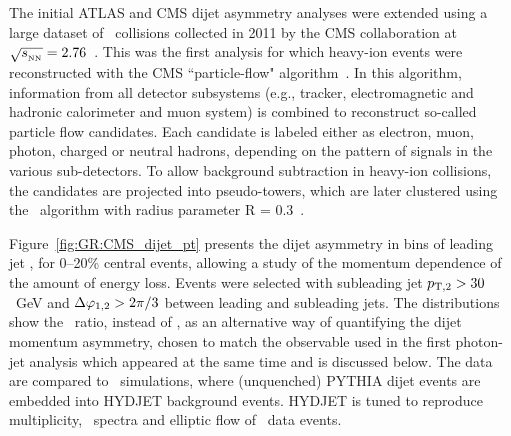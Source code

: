 The initial ATLAS and CMS dijet asymmetry analyses were extended using a
large dataset of \PbPb\ collisions
collected in 2011 by the CMS collaboration at $\sqrt{s_{_{\rm NN}}}=2.76$\TeV~\cite{CMS_dijet}.
This was the first analysis for which heavy-ion events were reconstructed
with the  CMS ``particle-flow"
algorithm~\cite{CMS-PAS-PFT-10-002,MattPFlow}. In this algorithm,
information from all detector subsystems (e.g., tracker, electromagnetic and hadronic
calorimeter and muon system) is combined to reconstruct so-called particle flow candidates.
Each candidate is labeled either as electron, muon, photon, charged or neutral hadrons,
depending on the pattern of signals in the various sub-detectors.
To allow background subtraction in heavy-ion collisions, the candidates are
projected into pseudo-towers, which are later clustered using the \ak\ algorithm
with radius parameter R = 0.3~\cite{Cacciari:2008gp}.

Figure~\ref{fig:GR:CMS_dijet_pt} presents the dijet asymmetry in bins of leading jet
\pT, for 0--20\% central events, allowing a study of the momentum dependence of the amount of energy loss.
Events were selected with subleading jet $p_{\rm{T},2}> 30$~GeV and $\Delta\varphi_{1,2}>2\pi/3$ between leading and subleading jets.
The distributions show the \ptrat\ ratio, instead of \AJ,  as an alternative
way of quantifying the dijet momentum asymmetry, chosen to match the
observable used in the first photon-jet analysis which appeared at the same time and is discussed
below. The data are compared to \PYTHYD\ simulations, where
(unquenched) PYTHIA dijet events are embedded into HYDJET background events.
HYDJET is tuned to reproduce multiplicity, \pT\ spectra and elliptic flow of \PbPb\
data events.

